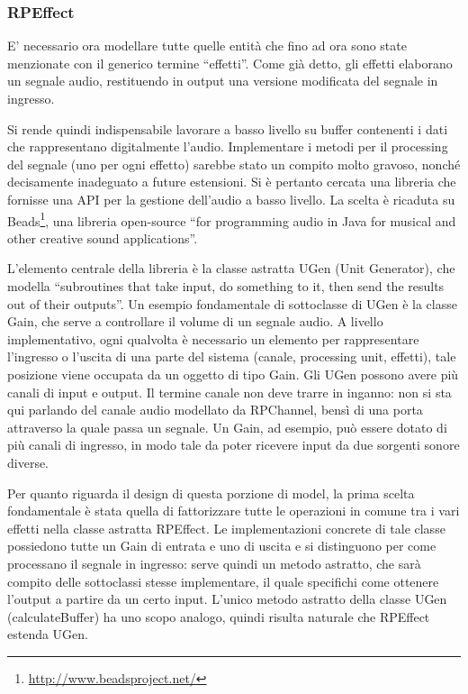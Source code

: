 \documentclass[a4paper,12pt]{report}
\begin{document}
\subsubsection{RPEffect}
E’ necessario ora modellare tutte quelle entità che fino ad ora sono state menzionate con il generico termine “effetti”. Come già detto, gli effetti elaborano un segnale audio, restituendo in output una versione modificata del segnale in ingresso. 

Si rende quindi indispensabile lavorare a basso livello su buffer contenenti i dati che rappresentano digitalmente l’audio. Implementare i metodi per il processing del segnale (uno per ogni effetto) sarebbe stato un compito molto gravoso, nonché decisamente inadeguato a future estensioni.
Si è pertanto cercata una libreria che fornisse una API per la gestione dell’audio a basso livello. La scelta è ricaduta su Beads\footnote[1]{\url{http://www.beadsproject.net/}}, una libreria open-source “for programming audio in Java for musical and other creative sound applications”. 

L’elemento centrale della libreria è la classe astratta UGen (Unit Generator), che modella “subroutines that take input, do something to it, then send the results out of their outputs”.
Un esempio fondamentale di sottoclasse di UGen è la classe Gain, che serve a controllare il volume di un segnale audio. A livello implementativo, ogni qualvolta è necessario un elemento per rappresentare l’ingresso o l’uscita di una parte del sistema (canale, processing unit, effetti), tale posizione viene occupata da un oggetto di tipo Gain.
Gli UGen possono avere più canali di input e output. Il termine canale non deve trarre in inganno: non si sta qui parlando del canale audio modellato da RPChannel, bensì di una porta attraverso la quale passa un segnale. Un Gain, ad esempio, può essere dotato di più canali di ingresso, in modo tale da poter ricevere input da due sorgenti sonore diverse.

Per quanto riguarda il design di questa porzione di model, la prima scelta fondamentale è stata quella di fattorizzare tutte le operazioni in comune tra i vari effetti nella classe astratta RPEffect. Le implementazioni concrete di tale classe possiedono tutte un Gain di entrata e uno di uscita e si distinguono per come processano il segnale in ingresso: serve quindi un metodo astratto, che sarà compito delle sottoclassi stesse implementare, il quale specifichi come ottenere l’output a partire da un certo input. L’unico metodo astratto della classe UGen (calculateBuffer) ha uno scopo analogo, quindi risulta naturale che RPEffect estenda UGen. 
\end{document}
